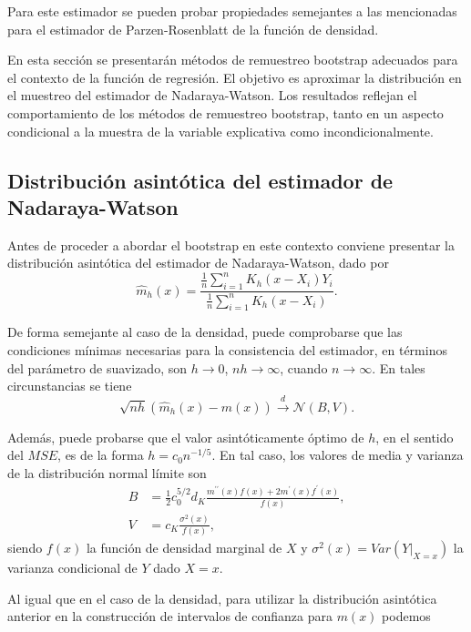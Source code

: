 \documentclass[
]{book}
\theoremstyle{break}
\theoremstyle{nonumberplain}
\begin{document}
Para este estimador se pueden probar propiedades semejantes a las
mencionadas para el estimador de Parzen-Rosenblatt de la función de
densidad.

En esta sección se presentarán métodos de remuestreo bootstrap adecuados
para el contexto de la función de regresión. El objetivo es aproximar la
distribución en el muestreo del estimador de Nadaraya-Watson. Los
resultados reflejan el comportamiento de los métodos de remuestreo
bootstrap, tanto en un aspecto condicional a la muestra de la variable
explicativa como incondicionalmente.

\subsection{Distribución asintótica del estimador de Nadaraya-Watson}\label{distribuciuxf3n-asintuxf3tica-del-estimador-de-nadaraya-watson}

Antes de proceder a abordar el bootstrap en este contexto conviene
presentar la distribución asintótica del estimador de Nadaraya-Watson,
dado por
\[\hat{m}_{h}\left( x \right) =\frac{\frac{1}{n}\sum_{i=1}^{n}K_{h}\left(
x-X_i \right) Y_i}{\frac{1}{n}\sum_{i=1}^{n}K_{h}\left( x-X_i \right)}.\]

De forma semejante al caso de la densidad, puede comprobarse que las
condiciones mínimas necesarias para la consistencia del estimador, en
términos del parámetro de suavizado, son \(h\rightarrow 0\),
\(nh\rightarrow \infty\), cuando \(n\rightarrow \infty\). En tales
circunstancias se tiene
\[\sqrt{nh}\left( \hat{m}_{h}\left( x \right) -m\left( x \right) \right) \overset
{d}{\rightarrow }\mathcal{N}\left( B,V \right) \text{.}\]

Además, puede probarse que el valor asintóticamente óptimo de \(h\), en el
sentido del \(MSE\), es de la forma \(h=c_{0}n^{-1/5}\). En tal caso, los
valores de media y varianza de la distribución normal límite son
\[\begin{aligned}
B &= \frac{1}{2}c_{0}^{5/2}d_{K}\frac{m^{\prime \prime }\left( x \right)
f\left( x \right) +2m^{\prime}\left( x \right) f^{\prime}\left( x \right)}{
f\left( x \right)}, \\
V &= c_{K}\frac{\sigma^2\left( x \right)}{f\left( x \right)},
\end{aligned}\]
siendo \(f\left( x \right)\) la función de densidad marginal de \(X\) y
\(\sigma^2\left( x \right) =Var\left( \left. Y\right\vert _{X=x} \right)\)
la varianza condicional de \(Y\) dado \(X=x\).

Al igual que en el caso de la densidad, para utilizar la distribución
asintótica anterior en la construcción de intervalos de confianza para
\(m\left( x \right)\) podemos
\end{document}
